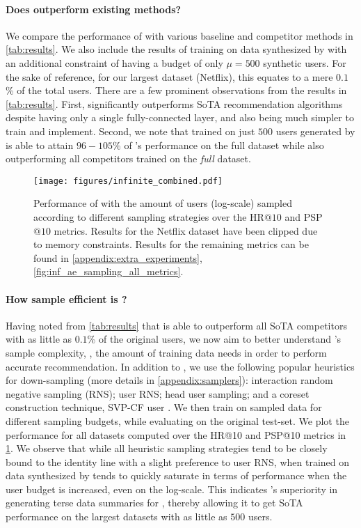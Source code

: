 \documentclass{article}
\begin{document}
\paragraph{Does \model outperform existing methods?} We compare the performance of \model with various baseline and competitor methods in \cref{tab:results}. We also include the results of training \model on data synthesized by \sampler with an additional constraint of having a budget of only $\mu = 500$ synthetic users. For the sake of reference, for our largest dataset (Netflix), this equates to a mere $0.1$\% of the total users. There are a few prominent observations from the results in \cref{tab:results}. First, \model significantly outperforms SoTA recommendation algorithms despite having only a single fully-connected layer, and also being much simpler to train and implement. Second, we note that \model trained on just $500$ users generated by \sampler is able to attain $96-105$\% of \model's performance on the full dataset while also outperforming all competitors trained on the \emph{full} dataset. 

\begin{figure}[!t] 
    \texttt{[image: figures/infinite\_combined.pdf]}
    \caption{Performance of \model with the amount of users (log-scale) sampled according to different sampling strategies over the HR$@10$ and PSP$@10$ metrics. Results for the Netflix dataset have been clipped due to memory constraints. Results for the remaining metrics can be found in \cref{appendix:extra_experiments}, \cref{fig:inf_ae_sampling_all_metrics}.}
    \label{fig:inf_ae_sampling}
\end{figure}

\paragraph{How sample efficient is \model?} Having noted from \cref{tab:results} that \model is able to outperform all SoTA competitors with as little as $0.1$\% of the original users, we now aim to better understand \model's sample complexity, \ie, the amount of training data \model needs in order to perform accurate recommendation. 
In addition to \sampler, we use the following popular heuristics for down-sampling (more details in \cref{appendix:samplers}): interaction random negative sampling (RNS); user RNS; head user sampling; and a coreset construction technique, SVP-CF user \cite{wsdm22}. We then train \model on sampled data for different sampling budgets, while evaluating on the original test-set. We plot the performance for all datasets computed over the HR@10 and PSP@10 metrics in \cref{fig:inf_ae_sampling}. We observe that while all heuristic sampling strategies tend to be closely bound to the identity line with a slight preference to user RNS, \model when trained on data synthesized by \sampler tends to 
quickly saturate in terms of performance when the user budget is increased, even on the log-scale.
This indicates \sampler's superiority in generating terse data summaries for \model, thereby allowing it to get SoTA performance on the largest datasets with as little as $500$ users.
\end{document}
